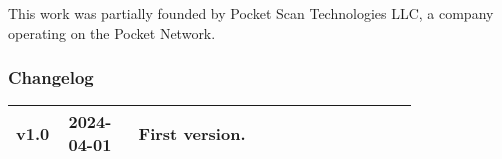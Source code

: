\documentclass[
	a4paper, %
	12pt, %
]{CSSullivanBusinessReport}
\begin{document}
	This work was partially founded by Pocket Scan Technologies LLC, a company operating on the Pocket Network.

	\vfill %
	
	\subsubsection*{Changelog}
	
	\scriptsize %
	
	\begin{tabular}{@{} L{0.05\linewidth} L{0.15\linewidth} L{0.6\linewidth} @{}} %
		\toprule
		v1.0 & 2024-04-01 & First version.\\
		\bottomrule
	\end{tabular}

\normalsize
\newpage


    \doublespacing
    \tableofcontents %
    \onehalfspacing

\newpage






\newpage


\printglossary[type=\acronymtype,title=List of Acronyms]


\newpage


	\printbibliography[title=Reference List] %


\end{document}
